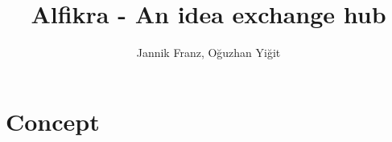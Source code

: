 \documentclass{report}
\title{Alfikra - An idea exchange hub}
\author{Jannik Franz, O\u{g}uzhan Yi\u{g}it}
\begin{document}
\maketitle
\setcounter{chapter}{1}
\section{Concept}
\end{document}
